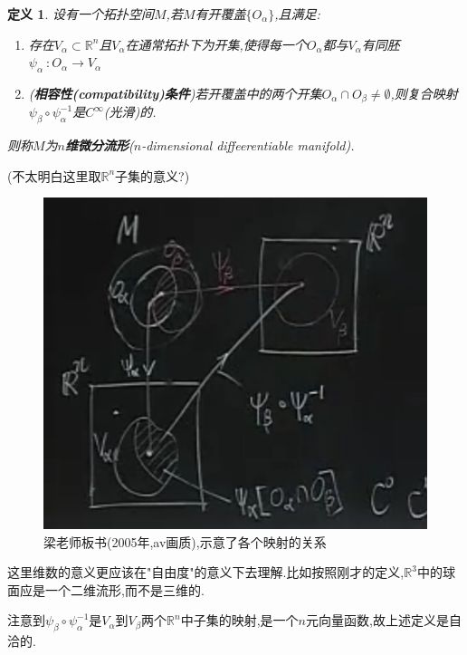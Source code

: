 \documentclass[UTF8]{article}
\begin{document}
	\newtheorem*{differentiableManifold}{定义}	
	
	\begin{differentiableManifold}
		
		设有一个拓扑空间$M$,若$M$有开覆盖$\{O_{\alpha}\}$,且满足:
		
		\begin{enumerate}
			
			\item 存在$V_{\alpha} \subset \mathbb{R}^n$且$V_{\alpha}$在通常拓扑下为开集,使得每一个$O_{\alpha}$都与$V_{\alpha}$有同胚$\psi_{\alpha}~:O_{\alpha} \to V_{\alpha}$
			
			\item (\textbf{相容性(compatibility)条件})若开覆盖中的两个开集$O_{\alpha} \cap O_{\beta} \ne \emptyset$,则复合映射$\psi_{\beta} \circ \psi_{\alpha}^{-1}$是$C^{\infty}$(光滑)的.
			
		\end{enumerate}
	
		则称$M$为\textbf{$n$维微分流形}($n$-dimensional diffeerentiable manifold).
		
	\end{differentiableManifold}
	
	(不太明白这里取$\mathbb{R}^n$子集的意义?)
	
	\begin{figure}[H]
		\centering
		\includegraphics[width=0.7\linewidth]{pics/QQ截图20210725215644}
		\caption{梁老师板书(2005年,av画质),示意了各个映射的关系}
		\label{fig:qq20210725215644}
	\end{figure}
	
	这里维数的意义更应该在"自由度"的意义下去理解.比如按照刚才的定义,$\mathbb{R}^3$中的球面应是一个二维流形,而不是三维的.
	
	注意到$\psi_{\beta} \circ \psi_{\alpha}^{-1}$是$V_{\alpha}$到$V_{\beta}$两个$\mathbb{R}^n$中子集的映射,是一个$n$元向量函数,故上述定义是自洽的.
	
\end{document}
